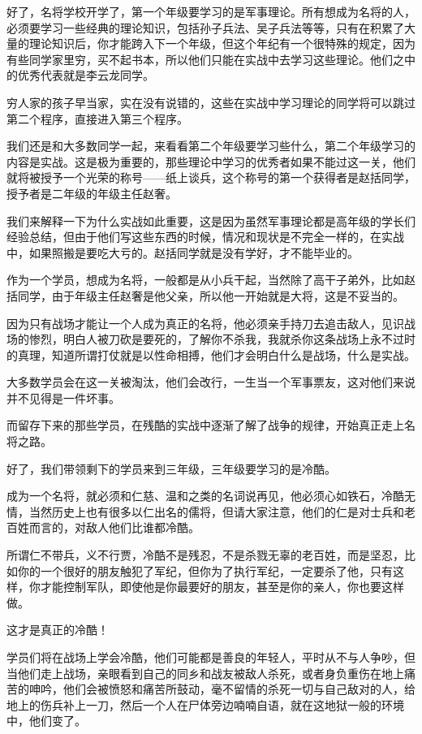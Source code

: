 \begin{multicols}{\theparacolNo}
		好了，名将学校开学了，第一个年级要学习的是军事理论。所有想成为名将的人，必须要学习一些经典的理论知识，包括孙子兵法、吴子兵法等等，只有在积累了大量的理论知识后，你才能跨入下一个年级，但这个年纪有一个很特殊的规定，因为有些同学家里穷，买不起书本，所以他们只能在实战中去学习这些理论。他们之中的优秀代表就是李云龙同学。

		穷人家的孩子早当家，实在没有说错的，这些在实战中学习理论的同学将可以跳过第二个程序，直接进入第三个程序。

		我们还是和大多数同学一起，来看看第二个年级要学习些什么，第二个年级学习的内容是实战。这是极为重要的，那些理论中学习的优秀者如果不能过这一关，他们就将被授予一个光荣的称号——纸上谈兵，这个称号的第一个获得者是赵括同学，授予者是二年级的年级主任赵奢。

		我们来解释一下为什么实战如此重要，这是因为虽然军事理论都是高年级的学长们经验总结，但由于他们写这些东西的时候，情况和现状是不完全一样的，在实战中，如果照搬是要吃大亏的。赵括同学就是没有学好，才不能毕业的。

		作为一个学员，想成为名将，一般都是从小兵干起，当然除了高干子弟外，比如赵括同学，由于年级主任赵奢是他父亲，所以他一开始就是大将，这是不妥当的。

		因为只有战场才能让一个人成为真正的名将，他必须亲手持刀去追击敌人，见识战场的惨烈，明白人被刀砍是要死的，了解你不杀我，我就杀你这条战场上永不过时的真理，知道所谓打仗就是以性命相搏，他们才会明白什么是战场，什么是实战。

		大多数学员会在这一关被淘汰，他们会改行，一生当一个军事票友，这对他们来说并不见得是一件坏事。

		而留存下来的那些学员，在残酷的实战中逐渐了解了战争的规律，开始真正走上名将之路。

		好了，我们带领剩下的学员来到三年级，三年级要学习的是冷酷。

		成为一个名将，就必须和仁慈、温和之类的名词说再见，他必须心如铁石，冷酷无情，当然历史上也有很多以仁出名的儒将，但请大家注意，他们的仁是对士兵和老百姓而言的，对敌人他们比谁都冷酷。

		所谓仁不带兵，义不行贾，冷酷不是残忍，不是杀戮无辜的老百姓，而是坚忍，比如你的一个很好的朋友触犯了军纪，但你为了执行军纪，一定要杀了他，只有这样，你才能控制军队，即使他是你最要好的朋友，甚至是你的亲人，你也要这样做。

		这才是真正的冷酷！

		学员们将在战场上学会冷酷，他们可能都是善良的年轻人，平时从不与人争吵，但当他们走上战场，亲眼看到自己的同乡和战友被敌人杀死，或者身负重伤在地上痛苦的呻吟，他们会被愤怒和痛苦所鼓动，毫不留情的杀死一切与自己敌对的人，给地上的伤兵补上一刀，然后一个人在尸体旁边喃喃自语，就在这地狱一般的环境中，他们变了。


\end{multicols}
